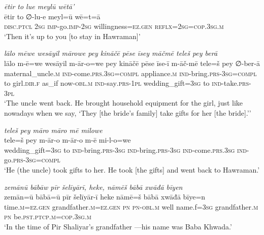 \ea \label{ŽP.263}
\textit{ētir to lue meylū wētā’} \\ 
\gll ētir to ∅-lu-e meyl=ū wē=t=ā \\ 
 \textsc{disc.ptcl} \textsc{2sg} \textsc{imp-}go.\textsc{imp-}\textsc{2sg} willingness\textsc{\textsc{=ez.gen}} \textsc{reflx}\textsc{=\textsc{2sg}}\textsc{=cop}\textsc{.3sg}\textsc{.m} \\ 
\glt `Then it’s up to you [to stay in Hawraman]'
\z 
 
\ea \label{ŽP.264}
\textit{lālo mēwe wesāyil mārowe pey kināčē pēse īsey māčmē teleš pey berā} \\ 
\gll lālo m-ē=we wesāyil m-ār-o=we pey kināčē pēse īse-ī m-āč-mē tele=š pey ∅-ber-ā \\ 
 maternal\_uncle\textsc{.m} \textsc{ind-}come\textsc{.prs}\textsc{.3sg}\textsc{=compl} appliance\textsc{.m} \textsc{ind-}bring\textsc{.prs}\textsc{-3sg}\textsc{=compl} to girl\textsc{.dir}\textsc{.f} as\_if now\textsc{-obl}\textsc{.m} \textsc{ind-}say\textsc{.prs}\textsc{-1pl} wedding\_gift\textsc{=3sg} to \textsc{ind-}take\textsc{.prs}\textsc{-3pl} \\ 
\glt `The uncle went back. He brought household equipment for the girl, just like nowadays when we say, ‘They [the bride’s family] take gifts for her [the bride].’'
\z 
 
\ea \label{ŽP.265}
\textit{teleš pey māro māro mē milowe} \\ 
\gll tele=š pey m-ār-o m-ār-o m-ē mi-l-o=we \\ 
 wedding\_gift\textsc{=3sg} to \textsc{ind-}bring\textsc{.prs}\textsc{-3sg} \textsc{ind-}bring\textsc{.prs}\textsc{-3sg} \textsc{ind-}come\textsc{.prs}\textsc{.3sg} \textsc{ind-}go\textsc{.prs}\textsc{-3sg}\textsc{=compl} \\ 
\glt `He (the uncle) took gifts to her. He took [the gifts] and went back to Hawraman.'
\z 
 
\ea \label{BP.1}
\textit{zemānū bābāw pīr šelīyārī, heke, nāmēš bābā xwāđā bīyen} \\ 
\gll zemān=ū bābā=ū pīr šelīyār-ī heke nāmē=š bābā xwāđā bīye=n \\ 
 time\textsc{.m}\textsc{=ez.gen} grandfather\textsc{.m}\textsc{=ez.gen} \textsc{pn} \textsc{pn}\textsc{-obl}\textsc{.m} well name.f\textsc{=3sg} grandfather\textsc{.m} \textsc{pn} be\textsc{.pst}\textsc{.ptcp}\textsc{.m}\textsc{=cop}\textsc{.3sg}\textsc{.m} \\ 
\glt `In the time of Pir Shaliyar’s grandfather —his name was Baba Khwada.'
\z 
 

